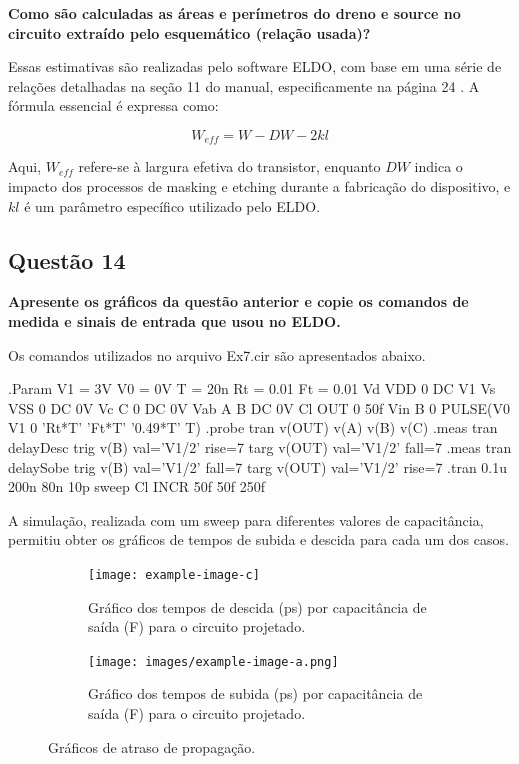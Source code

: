\documentclass[12pt,a4paper]{article}
\begin{document}
	\textbf{Como são calculadas as áreas e perímetros do dreno e source no circuito extraído pelo esquemático (relação usada)?}

Essas estimativas são realizadas pelo software ELDO, com base em uma série de relações detalhadas na seção 11 do manual, especificamente na página 24 \cite{ref1}. A fórmula essencial é expressa como:

$$
W_{eff} = W - DW - 2kl
$$

Aqui, $W_{eff}$ refere-se à largura efetiva do transistor, enquanto $DW$ indica o impacto dos processos de masking e etching durante a fabricação do dispositivo, e $kl$ é um parâmetro específico utilizado pelo ELDO.

\subsection*{Questão 14}

	\textbf{Apresente os gráficos da questão anterior e copie os comandos de medida e sinais de entrada que usou no ELDO.}

Os comandos utilizados no arquivo Ex7.cir são apresentados abaixo.

\begin{codeblock}[title={Comandos ELDO}, label={lst:eldo_commands}, listing options={language=TeX}]
.Param V1 = 3V V0 = 0V T = 20n Rt = 0.01 Ft = 0.01
Vd VDD 0 DC V1
Vs VSS 0 DC 0V
Vc C 0 DC 0V
Vab A B DC 0V
Cl OUT 0 50f
Vin B 0 PULSE(V0 V1 0 'Rt*T' 'Ft*T' '0.49*T' T)
.probe tran v(OUT) v(A) v(B) v(C)
.meas tran delayDesc trig v(B) val='V1/2' rise=7 targ v(OUT) val='V1/2'
fall=7
.meas tran delaySobe trig v(B) val='V1/2' fall=7 targ v(OUT) val='V1/2'
rise=7
.tran 0.1u 200n 80n 10p sweep Cl INCR 50f 50f 250f
\end{codeblock}

A simulação, realizada com um sweep para diferentes valores de capacitância, permitiu obter os gráficos de tempos de subida e descida para cada um dos casos.

\begin{figure}[H]
    \centering
    \begin{subfigure}[b]{0.48\textwidth}
        \texttt{[image: example-image-c]}
        \caption{Gráfico dos tempos de descida (ps) por capacitância de saída (F) para o circuito projetado.}
        \label{fig:delay_descida}
    \end{subfigure}
    \hfill
    \begin{subfigure}[b]{0.48\textwidth}
        \texttt{[image: images/example-image-a.png]}
        \caption{Gráfico dos tempos de subida (ps) por capacitância de saída (F) para o circuito projetado.}
        \label{fig:delay_subida}
    \end{subfigure}
    \caption{Gráficos de atraso de propagação.}
    \label{fig:delay_graphs}
\end{figure}
\end{document}
